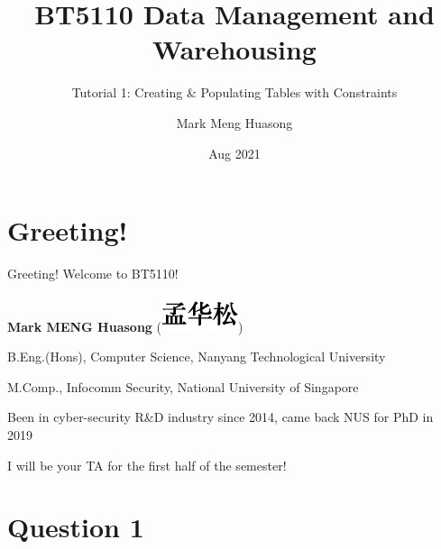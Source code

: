 \title{BT5110 Data Management and Warehousing}

\subtitle{Tutorial 1: Creating \& Populating Tables with Constraints}

\author{Mark Meng Huasong}



\date{Aug 2021}

\begin{frame}
	\titlepage
\end{frame}

\section*{Greeting!}

\begin{frame}[fragile]{Greeting!}
Welcome to BT5110!\vspace{15pt}

\textbf{Mark MENG Huasong} (\includegraphics[height=\fontcharht\font`\B]{t1/images/chn-chars.png}) \vspace{15pt}

B.Eng.(Hons), Computer Science, Nanyang Technological University

M.Comp., Infocomm Security, National University of Singapore\vspace{15pt}

Been in cyber-security R\&D industry since 2014, came back NUS for PhD in 2019\vspace{15pt}

I will be your TA for the first half of the semester!
\end{frame}

\section*{Question 1}

